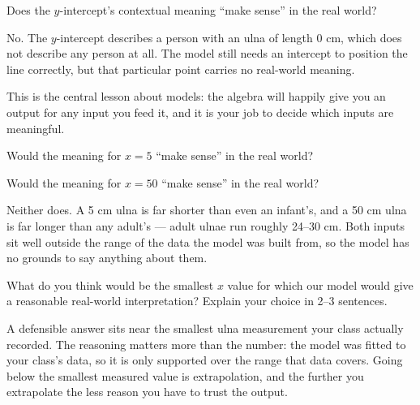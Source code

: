 \documentclass[12pt]{ximera}
\begin{document}
\begin{problem}
Does the $y$-intercept's contextual meaning ``make sense'' in the real world?
\begin{multipleChoice}
\end{multipleChoice}

\begin{freeResponse}
\end{freeResponse}

\begin{solution}
No. The $y$-intercept describes a person with an ulna of length 0 cm, which does not
describe any person at all. The model still needs an intercept to position the line
correctly, but that particular point carries no real-world meaning.

This is the central lesson about models: the algebra will happily give you an output
for any input you feed it, and it is your job to decide which inputs are meaningful.
\end{solution}
\end{problem}

\begin{problem}
Would the meaning for $x = 5$ ``make sense'' in the real world?
\begin{multipleChoice}
\end{multipleChoice}

Would the meaning for $x = 50$ ``make sense'' in the real world?
\begin{multipleChoice}
\end{multipleChoice}

\begin{solution}
Neither does. A 5 cm ulna is far shorter than even an infant's, and a 50 cm ulna is far
longer than any adult's --- adult ulnae run roughly 24--30 cm. Both inputs sit well
outside the range of the data the model was built from, so the model has no grounds to
say anything about them.
\end{solution}
\end{problem}

\begin{problem}
What do you think would be the smallest $x$ value for which our model would give a
reasonable real-world interpretation? Explain your choice in 2--3 sentences.

\begin{freeResponse}
\end{freeResponse}

\begin{solution}
A defensible answer sits near the smallest ulna measurement your class actually
recorded. The reasoning matters more than the number: the model was fitted to your
class's data, so it is only supported over the range that data covers. Going below the
smallest measured value is extrapolation, and the further you extrapolate the less
reason you have to trust the output.
\end{solution}
\end{problem}
\end{document}
